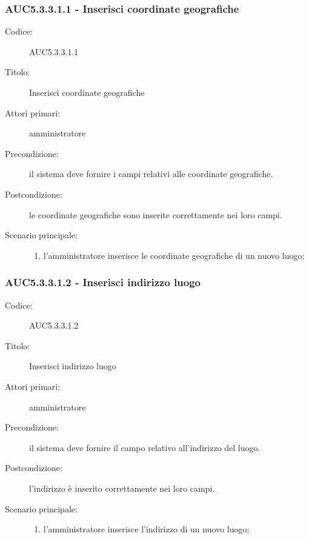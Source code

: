 \documentclass[../../../analisi-dei-requisiti.tex]{subfiles}
\begin{document}
\subsubsection{AUC5.3.3.1.1 - Inserisci coordinate geografiche}%
\label{subs:AUC5.3.3.1.1}
\begin{description}
  \item[Codice:] AUC5.3.3.1.1
  \item[Titolo:] Inserisci coordinate geografiche
  \item[Attori primari:] amministratore
  \item[Precondizione:] il sistema deve fornire i campi relativi alle coordinate geografiche.
  \item[Postcondizione:] le coordinate geografiche sono inserite correttamente nei loro campi.
  \item[Scenario principale:]
  \begin{enumerate}
    \item l'amministratore inserisce le coordinate geografiche di un nuovo luogo;
  \end{enumerate}
\end{description}

\subsubsection{AUC5.3.3.1.2 - Inserisci indirizzo luogo}%
\label{subs:AUC5.3.3.1.2}
\begin{description}
  \item[Codice:] AUC5.3.3.1.2
  \item[Titolo:] Inserisci indirizzo luogo
  \item[Attori primari:] amministratore
  \item[Precondizione:] il sistema deve fornire il campo relativo all'indirizzo del luogo.
  \item[Postcondizione:] l'indirizzo è inserito correttamente nei loro campi.
  \item[Scenario principale:]
  \begin{enumerate}
    \item l'amministratore inserisce l'indirizzo di un nuovo luogo;
  \end{enumerate}
\end{description}
\end{document}
